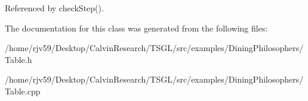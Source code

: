 Referenced by check\+Step().



The documentation for this class was generated from the following files\+:\begin{DoxyCompactItemize}
\item 
/home/rjv59/\+Desktop/\+Calvin\+Research/\+T\+S\+G\+L/src/examples/\+Dining\+Philosophers/Table.\+h\item 
/home/rjv59/\+Desktop/\+Calvin\+Research/\+T\+S\+G\+L/src/examples/\+Dining\+Philosophers/Table.\+cpp\end{DoxyCompactItemize}
